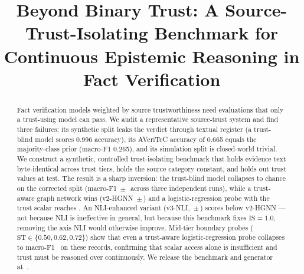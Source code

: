 \documentclass[conference]{IEEEtran}
\begin{document}
\title{Beyond Binary Trust: A Source-Trust-Isolating Benchmark for Continuous Epistemic Reasoning in Fact Verification}

\author{
\and
{}
\and
{}
}

\maketitle

\begin{abstract}
Fact verification models weighted by source trustworthiness need evaluations that only a trust-using model can pass. We audit a representative source-trust system and find three failures: its synthetic split leaks the verdict through textual register (a trust-blind model scores 0.996 accuracy), its AVeriTeC accuracy of 0.665 equals the majority-class prior (macro-F1 0.265), and its simulation split is closed-world trivial. We construct a synthetic, controlled trust-isolating benchmark that holds evidence text byte-identical across trust tiers, holds the source category constant, and holds out trust values at test. The result is a sharp inversion: the trust-blind model collapses to chance on the corrected split (macro-F1 \BaselineMF\,$\pm$\,\BaselineStd\ across three independent runs), while a trust-aware graph network wins (v2-HGNN \VtwoMF\,$\pm$\,\VtwoStd) and a logistic-regression probe with the trust scalar reaches \LogAwareMF. An NLI-enhanced variant (v3-NLI, \VthreeMF\,$\pm$\,\VthreeStd) scores below v2-HGNN --- not because NLI is ineffective in general, but because this benchmark fixes $\mathrm{IS}=1.0$, removing the axis NLI would otherwise improve. Mid-tier boundary probes ($\mathrm{ST}\in\{0.50,0.62,0.72\}$) show that even a trust-aware logistic-regression probe collapses to macro-F1 \MidTierMF\ on these records, confirming that scalar access alone is insufficient and trust must be reasoned over continuously. We release the benchmark and generator at~\cite{karki2026benchmark}.
\end{abstract}
\end{document}
